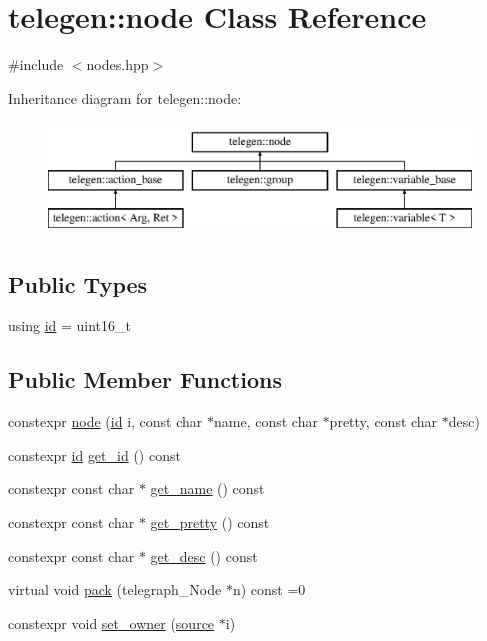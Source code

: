 \hypertarget{classtelegen_1_1node}{}\section{telegen\+:\+:node Class Reference}
\label{classtelegen_1_1node}


{\ttfamily \#include $<$nodes.\+hpp$>$}

Inheritance diagram for telegen\+:\+:node\+:\begin{figure}[H]
\begin{center}
\leavevmode
\includegraphics[height=3.000000cm]{classtelegen_1_1node}
\end{center}
\end{figure}
\subsection*{Public Types}
\begin{DoxyCompactItemize}
\item 
using \hyperlink{classtelegen_1_1node_aae3ff0d12932c55fdc88a1743e27ea56}{id} = uint16\+\_\+t
\end{DoxyCompactItemize}
\subsection*{Public Member Functions}
\begin{DoxyCompactItemize}
\item 
constexpr \hyperlink{classtelegen_1_1node_ae046ceb8c032f5655160173c0777dba8}{node} (\hyperlink{classtelegen_1_1node_aae3ff0d12932c55fdc88a1743e27ea56}{id} i, const char $\ast$name, const char $\ast$pretty, const char $\ast$desc)
\item 
constexpr \hyperlink{classtelegen_1_1node_aae3ff0d12932c55fdc88a1743e27ea56}{id} \hyperlink{classtelegen_1_1node_a9e94c3554697bb443e67316170815eed}{get\+\_\+id} () const
\item 
constexpr const char $\ast$ \hyperlink{classtelegen_1_1node_afc6c76d81436f9040668324ed2d65ce4}{get\+\_\+name} () const
\item 
constexpr const char $\ast$ \hyperlink{classtelegen_1_1node_aa92b0c42b744508c2b39bc047051a3ec}{get\+\_\+pretty} () const
\item 
constexpr const char $\ast$ \hyperlink{classtelegen_1_1node_a9393b332196fe1a8458d85308f8551d5}{get\+\_\+desc} () const
\item 
virtual void \hyperlink{classtelegen_1_1node_a8b6169d62f6e7c2e301435e52442fed3}{pack} (telegraph\+\_\+\+Node $\ast$n) const =0
\item 
constexpr void \hyperlink{classtelegen_1_1node_a33a4f88e44337dcf2885e3e787970db7}{set\+\_\+owner} (\hyperlink{classtelegen_1_1source}{source} $\ast$i)
\end{DoxyCompactItemize}
